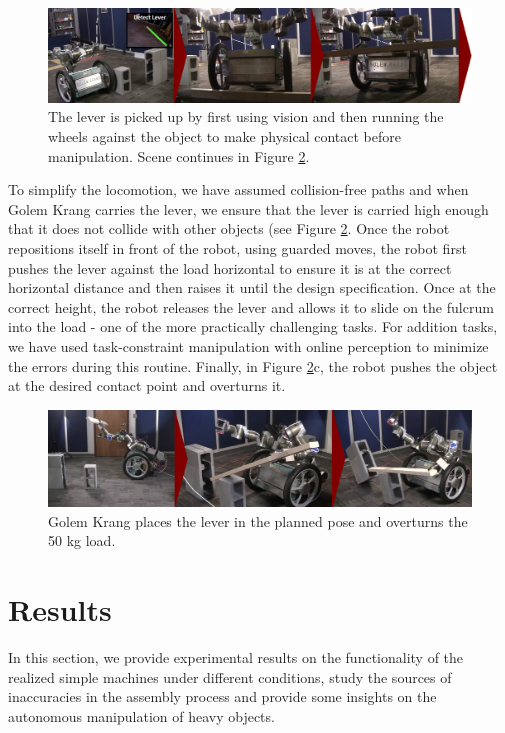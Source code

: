 \documentclass[runningheads,a4paper]{llncs}
\begin{document}
\begin{figure}[ht!]  	
  \centering
  \includegraphics[width=1.0\linewidth]{Figures/c.png}
  \caption{The lever is picked up by first using vision and then running
	the wheels against the object to make physical contact before manipulation. Scene continues 
	in Figure \ref{fig:typical_d}.}
  \label{fig:typical_c}
\end{figure}

To simplify the locomotion, we have assumed collision-free paths and when Golem Krang carries the
lever, we ensure that the lever is carried high enough that it does not collide with other objects
(see Figure \ref{fig:typical_d}. Once the robot repositions itself in front of the robot, using
guarded moves, the robot first pushes the lever against the load horizontal to ensure it is at
the correct horizontal distance and then raises it until the design specification. Once at the
correct height, the robot releases the lever and allows it to slide on the fulcrum into the load
 - one of the more practically challenging tasks. For addition tasks, we have used task-constraint
 manipulation with online perception to minimize the errors during this routine. Finally, in
 Figure \ref{fig:typical_d}c, the robot pushes the object at the desired contact point and overturns
it.

\begin{figure}[ht!] 
  \centering
  \includegraphics[width=1.0\linewidth]{Figures/d.png}
  \caption{Golem Krang places the lever in the planned pose and overturns the 50 kg load.}
  \label{fig:typical_d}
\end{figure}

\section{Results}

In this section, we provide experimental results on the functionality of the realized simple
machines under different conditions, study the sources of inaccuracies in the assembly process
and provide some insights on the autonomous manipulation of heavy objects. 
\end{document}
